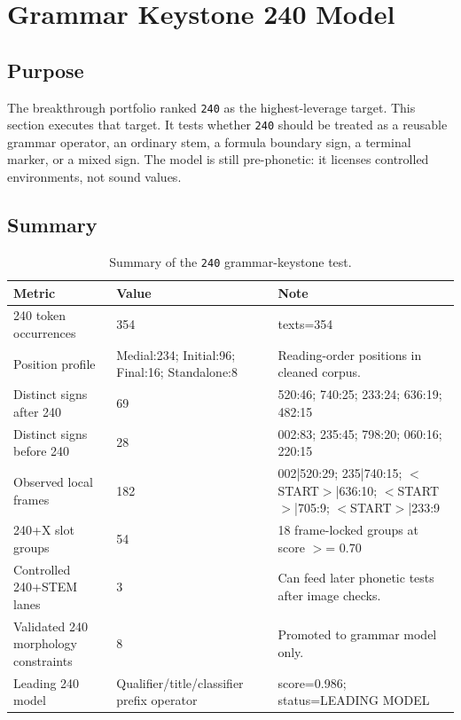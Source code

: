 \section{Grammar Keystone 240 Model}

\subsection{Purpose}

The breakthrough portfolio ranked \texttt{240} as the highest-leverage target. This section executes that target. It tests whether \texttt{240} should be treated as a reusable grammar operator, an ordinary stem, a formula boundary sign, a terminal marker, or a mixed sign. The model is still pre-phonetic: it licenses controlled environments, not sound values.

\subsection{Summary}

\begin{table}[htbp]
\centering
\footnotesize
\begin{tabular}{p{}p{}p{}}
\toprule
\textbf{Metric} & \textbf{Value} & \textbf{Note} \\
\midrule
240 token occurrences & 354 & texts=354 \\
Position profile & Medial:234; Initial:96; Final:16; Standalone:8 & Reading-order positions in cleaned corpus. \\
Distinct signs after 240 & 69 & 520:46; 740:25; 233:24; 636:19; 482:15 \\
Distinct signs before 240 & 28 & 002:83; 235:45; 798:20; 060:16; 220:15 \\
Observed local frames & 182 & 002|520:29; 235|740:15; $<$START$>$|636:10; $<$START$>$|705:9; $<$START$>$|233:9 \\
240+X slot groups & 54 & 18 frame-locked groups at score $>$= 0.70 \\
Controlled 240+STEM lanes & 3 & Can feed later phonetic tests after image checks. \\
Validated 240 morphology constraints & 8 & Promoted to grammar model only. \\
Leading 240 model & Qualifier/title/classifier prefix operator & score=0.986; status=LEADING MODEL \\
\bottomrule
\end{tabular}
\caption{Summary of the \texttt{240} grammar-keystone test.}
\label{tab:grammar-keystone-240-summary}
\end{table}

